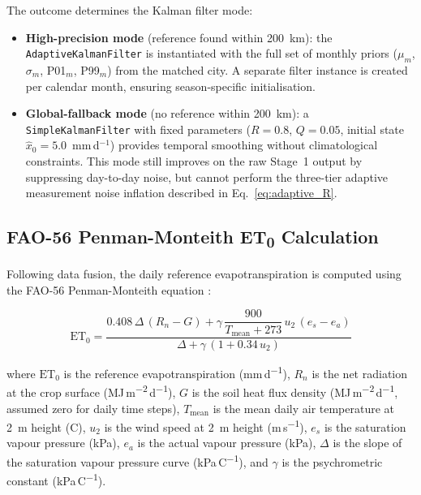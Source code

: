 \documentclass[preprint,review,12pt]{elsarticle}
\begin{document}
The outcome determines the Kalman filter mode:
\begin{itemize}
\item \textbf{High-precision mode} (reference found within 200~km): the
  \texttt{AdaptiveKalmanFilter} is instantiated with the full set of monthly
  priors ($\mu_m$, $\sigma_m$, P01$_m$, P99$_m$) from the matched city.  A
  separate filter instance is created per calendar month, ensuring
  season-specific initialisation.

\item \textbf{Global-fallback mode} (no reference within 200~km): a
  \texttt{SimpleKalmanFilter} with fixed parameters ($R = 0.8$, $Q = 0.05$,
  initial state $\hat{x}_0 = 5.0$~mm\,d$^{-1}$) provides temporal smoothing
  without climatological constraints.  This mode still improves on the raw
  Stage~1 output by suppressing day-to-day noise, but cannot perform the
  three-tier adaptive measurement noise inflation described in
  Eq.~\eqref{eq:adaptive_R}.
\end{itemize}


\subsection{FAO-56 Penman-Monteith ET\textsubscript{0} Calculation}
\label{subsec:eto}

Following data fusion, the daily reference evapotranspiration is computed using
the FAO-56 Penman-Monteith equation \citep{Allen1998}:

\begin{equation}
\text{ET}_0 = \frac{0.408\,\Delta\,(R_n - G) + \gamma\,\dfrac{900}{T_{\text{mean}}+273}\,u_2\,(e_s - e_a)}{\Delta + \gamma\,(1 + 0.34\,u_2)}
\label{eq:fao56}
\end{equation}

\noindent where $\text{ET}_0$ is the reference evapotranspiration
(mm\,d\textsuperscript{$-1$}), $R_n$ is the net radiation at the crop surface
(MJ\,m\textsuperscript{$-2$}\,d\textsuperscript{$-1$}), $G$ is the soil heat
flux density (MJ\,m\textsuperscript{$-2$}\,d\textsuperscript{$-1$}, assumed
zero for daily time steps), $T_{\text{mean}}$ is the mean daily air temperature
at 2~m height (\textdegree{}C), $u_2$ is the wind speed at 2~m height
(m\,s\textsuperscript{$-1$}), $e_s$ is the saturation vapour pressure (kPa),
$e_a$ is the actual vapour pressure (kPa), $\Delta$ is the slope of the
saturation vapour pressure curve (kPa\,\textdegree{}C\textsuperscript{$-1$}),
and $\gamma$ is the psychrometric constant
(kPa\,\textdegree{}C\textsuperscript{$-1$}).
\end{document}
